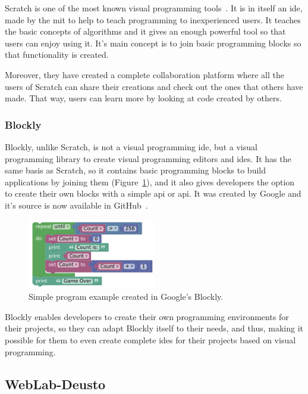 Scratch is one of the most known visual programming tools~\cite{scratch}. It is in itself an
\acrshort{ide}, made by the \acrshort{mit} to help to teach programming to inexperienced users. It
teaches the basic concepts of algorithms and it gives an enough powerful tool so that users can
enjoy using it. It's main concept is to join basic programming blocks so that functionality is
created.

Moreover, they have created a complete collaboration platform where all the users of Scratch can
share their creations and check out the ones that others have made. That way, users can learn more
by looking at code created by others.

\subsubsection{Blockly}

Blockly, unlike Scratch, is not a visual programming \acrshort{ide}, but a visual programming
library to create visual programming editors and \acrshort{ide}s. It has the same basis as Scratch,
so it contains basic programming blocks to build applications by joining them
(Figure~\ref{fig:blockly}), and it also gives developers the option to create their own blocks with
a simple \acrlong{api} or \acrshort{api}. It was created by Google and it's source is now available
in GitHub~\cite{blockly}.

\begin{figure}[ht]
	\centering
	\includegraphics[width=0.5\textwidth]{fig/blockly}
	\caption{Simple program example created in Google's Blockly.}\label{fig:blockly}
\end{figure}

Blockly enables developers to create their own programming environments for their projects, so they
can adapt Blockly itself to their needs, and thus, making it possible for them to even create
complete \acrshort{ide}s for their projects based on visual programming.

\subsection{WebLab-Deusto}

